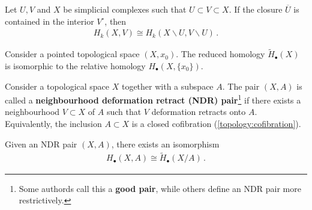     \begin{theorem}\label{topology:excision_theorem}
        Let $U,V$ and $X$ be simplicial complexes such that $U\subset V\subset X$. If the closure $\overline{U}$ is contained in the interior $V^\circ$, then
        \begin{gather}
            H_k(X,V) \cong H_k(X\backslash U,V\backslash U)\,.
        \end{gather}
    \end{theorem}

    \begin{property}
        Consider a pointed topological space $(X,x_0)$. The reduced homology $\widetilde{H}_\bullet(X)$ is isomorphic to the relative homology $H_\bullet(X,\{x_0\})$.
    \end{property}

    \begin{property}\label{topology:ndr_pair_homology}
        Consider a topological space $X$ together with a subspace $A$. The pair $(X,A)$ is called a \textbf{neighbourhood deformation retract (NDR) pair}\footnote{Some authords call this a \textbf{good pair}, while others define an NDR pair more restrictively.} if there exists a neighbourhood $V\subset X$ of $A$ such that $V$ deformation retracts onto $A$. Equivalently, the inclusion $A\subset X$ is a closed cofibration (\cref{topology:cofibration}).

        Given an NDR pair $(X,A)$, there exists an isomorphism
        \begin{gather}
            H_\bullet(X,A)\cong\widetilde{H}_\bullet(X/A)\,.
        \end{gather}
    \end{property}

